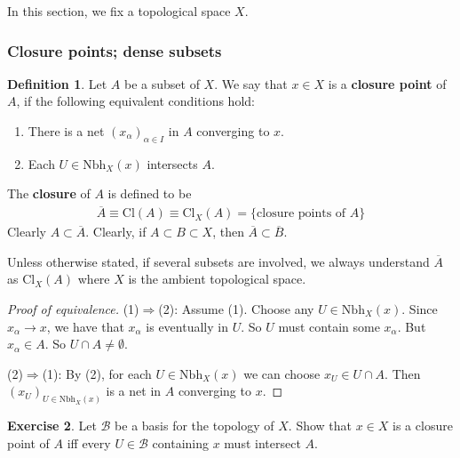 \documentclass[12pt,b5paper,notitlepage]{article}
\theoremstyle{definition}
\newtheorem{df}{Definition}[section]
\newtheorem{exe}[df]{Exercise}
\theoremstyle{plain}
\newcommand{\mc}{\mathcal}
\newcommand{\ovl}{\overline}
\newcommand{\Nbh}{\mathrm{Nbh}}
\newcommand{\Cl}{\mathrm{Cl}}
\numberwithin{equation}{section}
\begin{document}
In this section, we fix a topological space $X$.


\subsubsection{Closure points; dense subsets}





\begin{df}\label{lb183}
Let $A$ be a subset of $X$. We say that $x\in X$ is a \textbf{closure point}  of $A$, if the following equivalent conditions hold:
\begin{enumerate}[label=(\arabic*)]
\item There is a net $(x_\alpha)_{\alpha\in I}$ in $A$ converging to $x$.
\item Each $U\in \Nbh_X(x)$ intersects $A$. 
\end{enumerate}
The \textbf{closure} of $A$ is defined to be \index{Acl@$\ovl A=\Cl_X(A)$, closure}
\begin{align*}
\ovl A\equiv\Cl(A)\equiv\Cl_X(A)=\{\text{closure points of }A\}
\end{align*}
Clearly $A\subset \ovl A$. Clearly, if $A\subset B\subset X$, then $\ovl A\subset\ovl B$.
\end{df}

Unless otherwise stated, if several subsets are involved, we always understand $\ovl A$ as $\Cl_X(A)$ where $X$ is the ambient topological space.

\begin{proof}[Proof of equivalence]
(1)$\Rightarrow$(2): Assume (1). Choose any $U\in\Nbh_X(x)$. Since $x_\alpha\rightarrow x$, we have that $x_\alpha$ is eventually in $U$. So $U$ must contain some $x_\alpha$. But $x_\alpha\in A$. So $U\cap A\neq\emptyset$.

(2)$\Rightarrow$(1):  By (2), for each $U\in\Nbh_X(x)$ we can choose $x_U\in U\cap A$. Then $(x_U)_{U\in\Nbh_X(x)}$ is a net in $A$ converging to $x$. 
\end{proof}







\begin{exe}
Let $\mc B$ be a basis for the topology of $X$. Show that $x\in X$ is a closure point of $A$ iff every $U\in\mc B$ containing $x$ must intersect $A$.
\end{exe}
\end{document}

